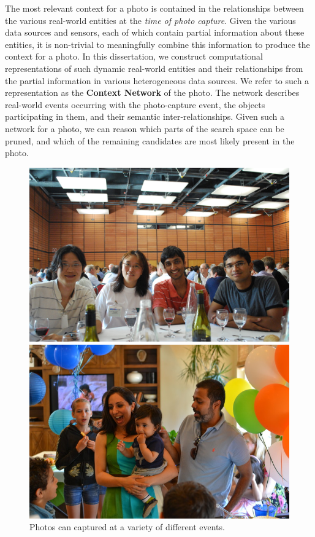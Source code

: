 The most relevant context for a photo is contained in the relationships between the various real-world entities at the \textit{time of photo capture}. Given the various data sources and sensors, each of which contain partial information about these entities, it is non-trivial to meaningfully combine this information to produce the context for a photo. In this dissertation, we construct computational representations of such dynamic real-world entities and their relationships from the partial information in various heterogeneous data sources. We refer to such a representation as the \textbf{Context Network} of the photo. The network describes real-world events occurring with the photo-capture event, the objects participating in them, and their semantic inter-relationships. Given such a network for a photo, we can reason which parts of the search space can be pruned, and which of the remaining candidates are most likely present in the photo.

\begin{figure}[t]
\centering
\begin{minipage}[b]{0.45\linewidth}
  \includegraphics[width=\textwidth]{media/chapter1/vldb}
\end{minipage}
\begin{minipage}[b]{0.45\linewidth}
  \includegraphics[width=\textwidth]{media/chapter1/nishkas}
\end{minipage}
\caption{Photos can captured at a variety of different events.}
\label{fig:people}
\end{figure}

